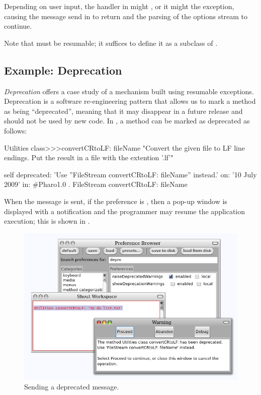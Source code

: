 \documentclass[a4paper,10pt,twoside]{book}
\begin{document}
\noindent
Depending on user input, the handler in  might  , or it might  the exception, causing the  message send in  to return and the parsing of the options stream to continue.

Note that  must be resumable; it suffices to define it as a subclass of .

\subsection{Example: Deprecation}

\emph{Deprecation} offers a case study of a mechanism built using resumable exceptions.
Deprecation is a software re-engineering pattern that allows us to mark a method as being ``deprecated'', meaning that it may disappear in a future release and should not be used by new code.
In \pharo, a method can be marked as deprecated as follows:

\begin{code}{}
Utilities class>>>convertCRtoLF: fileName
	"Convert the given file to LF line endings. Put the result in a file with the extention '.lf'"

	self deprecated: 'Use ''FileStream convertCRtoLF: fileName'' instead.' 
		on: '10 July 2009' in: #Pharo1.0 .
	FileStream convertCRtoLF: fileName
\end{code}

When the message  is sent, if the  preference is  , then a pop-up window is displayed with a notification and the programmer may resume the application execution; this is shown in .


\begin{figure}[ht]\centering
        \includegraphics[width=\linewidth]{Deprecation}
        \caption{Sending a deprecated message.}
\end{figure}
\end{document}
